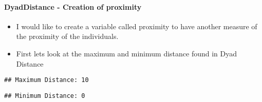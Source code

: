 \documentclass[
]{article}
\providecommand{\tightlist}{%
  \setlength{\itemsep}{0pt}\setlength{\parskip}{0pt}}
\begin{document}
\hypertarget{dyaddistance---creation-of-proximity}{%
\paragraph{DyadDistance - Creation of
proximity}\label{dyaddistance---creation-of-proximity}}

\begin{itemize}
\tightlist
\item
  I would like to create a variable called proximity to have another
  measure of the proximity of the individuals.
\item
  First lets look at the maximum and minimum distance found in Dyad
  Distance
\end{itemize}

\begin{verbatim}
## Maximum Distance: 10
\end{verbatim}

\begin{verbatim}
## Minimum Distance: 0
\end{verbatim}
\end{document}
